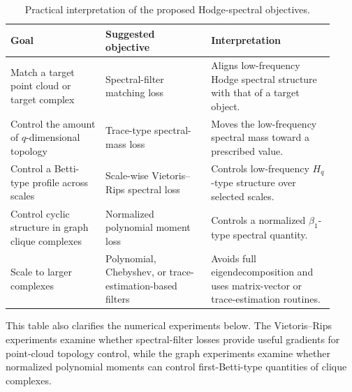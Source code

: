 \documentclass[pdflatex,sn-mathphys-ay]{sn-jnl}%
\theoremstyle{thmstyleone}%
\theoremstyle{thmstyletwo}%
\theoremstyle{thmstylethree}%
\begin{document}
{\color{red}
\begin{table}[t]
\centering
\caption{Practical interpretation of the proposed Hodge-spectral objectives.}
\label{tab:objective_usage}
\begin{tabular}{p{0.27\linewidth}p{0.30\linewidth}p{0.35\linewidth}}
\toprule
Goal & Suggested objective & Interpretation \\
\midrule
Match a target point cloud or target complex
&
Spectral-filter matching loss
&
Aligns low-frequency Hodge spectral structure with that of a target object. \\
Control the amount of \(q\)-dimensional topology
&
Trace-type spectral-mass loss
&
Moves the low-frequency spectral mass toward a prescribed value. \\
Control a Betti-type profile across scales
&
Scale-wise Vietoris--Rips spectral loss
&
Controls low-frequency \(H_q\)-type structure over selected scales. \\
Control cyclic structure in graph clique complexes
&
Normalized polynomial moment loss
&
Controls a normalized \(\beta_1\)-type spectral quantity. \\
Scale to larger complexes
&
Polynomial, Chebyshev, or trace-estimation-based filters
&
Avoids full eigendecomposition and uses matrix-vector or trace-estimation routines. \\
\bottomrule
\end{tabular}
\end{table}
}

This table also clarifies the numerical experiments below. The Vietoris--Rips experiments examine whether spectral-filter losses provide useful gradients for point-cloud topology control, while the graph experiments examine whether normalized polynomial moments can control first-Betti-type quantities of clique complexes.



\end{document}
